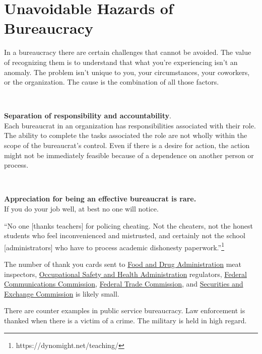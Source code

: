 \section{Unavoidable Hazards of Bureaucracy\label{sec:unavoidable-hazards}}

In a bureaucracy there are certain challenges that cannot be avoided. The value of recognizing them is to understand that what you're experiencing isn't an anomaly. The problem isn't unique to you, your circumstances, your coworkers, or the organization. The cause is the combination of all those factors.

\ \\

\begin{samepage}
\textbf{Separation of responsibility and accountability}. \\
Each bureaucrat in an organization has responsibilities associated with their role. The ability to complete the tasks associated the role are not wholly within the scope of the bureaucrat's control. Even if there is a desire for action, the action might not be immediately feasible because of a dependence on another person or process. 
\end{samepage}

\ \\

\begin{samepage}
\textbf{Appreciation for being an effective bureaucrat is rare.}\\
If you do your job well, at best no one will notice.

``No one [thanks teachers] for policing cheating. Not the cheaters, not the honest students who feel inconvenienced and mistrusted, and certainly not the school [administrators] who have to process academic dishonesty paperwork.''\footnote{https://dynomight.net/teaching/}
\end{samepage}

The number of thank you cards sent to \href{https://www.fda.gov/}{Food and Drug Administration} meat inspectors, \href{https://www.osha.gov/}{Occupational Safety and Health Administration} regulators, \href{https://www.fcc.gov/}{Federal Communications Commission}, \href{https://www.ftc.gov/}{Federal Trade Commission}, and \href{https://www.sec.gov/}{Securities and Exchange Commission} is likely small. 

There are counter examples in public service bureaucracy. 
Law enforcement is thanked when there is a victim of a crime. The military is held in high regard. 

